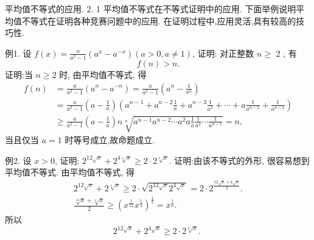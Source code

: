 
平均值不等式的应用.
2. 1 平均值不等式在不等式证明中的应用.
下面举例说明平均值不等式在证明各种竞赛问题中的应用.
在证明过程中,应用灵活,具有较高的技巧性.



例1. 设 $f(x)=\frac{a}{a^2-1}\left(a^x-a^{-x}\right)(a>0, a \neq 1)$, 证明: 对正整数 $n \geqslant$ 2 , 有
$$
f(n)>n .
$$
证明:当 $n \geqslant 2$ 时, 由平均值不等式, 得
$$
\begin{aligned}
f(n) & =\frac{a}{a^2-1}\left(a^n-a^{-n}\right)=\frac{a}{a^2-1}\left(a^n-\frac{1}{a^n}\right) \\
& =\frac{a}{a^2-1}\left(a-\frac{1}{a}\right)\left(a^{n-1}+a^{n-2} \frac{1}{a}+a^{n-3} \frac{1}{a^2}+\cdots+a \frac{1}{a^{n-2}}+\frac{1}{a^{n-1}}\right) \\
& \geqslant \frac{a}{a^2-1}\left(a-\frac{1}{a}\right) n \sqrt[n]{a^{n-1} a^{n-2} \cdots a^2 a \frac{1}{a} \frac{1}{a^2} \cdots \frac{1}{a^{n-1}}}=n,
\end{aligned}
$$
当且仅当 $a=1$ 时等号成立,故命题成立.



例2. 设 $x>0$, 证明: $2^{12 \sqrt{x}}+2^{4 \sqrt[4]{x}} \geqslant 2 \cdot 2^{\sqrt[6]{x}}$.
证明:由该不等式的外形, 很容易想到平均值不等式.
由平均值不等式, 得
$$
\begin{gathered}
2^{12 \sqrt{x}}+2^{\sqrt[4]{x}} \geqslant 2 \cdot \sqrt{2^{12 \sqrt{x}} 2^{4 \sqrt{x}}}=2 \cdot 2^{\frac{12 \sqrt{x}+4 \sqrt{x}}{2}} . \\
\frac{\sqrt[12]{x}+\sqrt[4]{x}}{2} \geqslant\left(x^{\frac{1}{12}} x^{\frac{1}{4}}\right)^{\frac{1}{2}}=x^{\frac{1}{6}} .
\end{gathered}
$$
所以
$$
2^{12 \sqrt{x}}+2^{4 \sqrt{x}} \geqslant 2 \cdot 2^{\sqrt[6]{x}} \text {. }
$$




